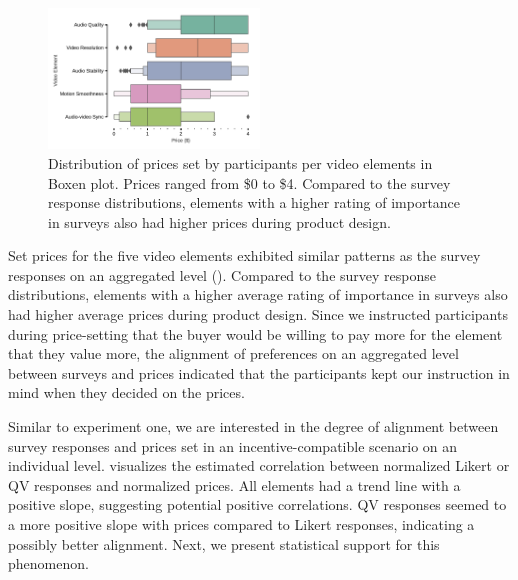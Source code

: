 \begin{figure}[ht]
    \centering
    \includegraphics[width=0.5\textwidth, keepaspectratio=true]{content/image/price_distribution_per_element.pdf}
    \caption{
      Distribution of prices set by participants per video elements in Boxen plot. 
      Prices ranged from \$0 to \$4. Compared to the survey response distributions, elements with a higher rating of importance in surveys also had higher prices during product design.
    }
    \label{fig:price_exp2}
\end{figure}


Set prices for the five video elements exhibited similar patterns as the survey responses on an aggregated level (). Compared to the survey response distributions, elements with a higher average rating of importance in surveys also had higher average prices during product design. Since we instructed participants during price-setting that the buyer would be willing to pay more for the element that they value more, the alignment of preferences on an aggregated level between surveys and prices indicated that the participants kept our instruction in mind when they decided on the prices.


Similar to experiment one, we are interested in the degree of alignment between survey responses and prices set in an incentive-compatible scenario on an individual level.  visualizes the estimated correlation between normalized Likert or QV responses and normalized prices. All elements had a trend line with a positive slope, suggesting potential positive correlations. QV responses seemed to {} a more positive slope with prices compared to Likert responses, indicating a possibly better alignment. Next, we present statistical support for this phenomenon.

